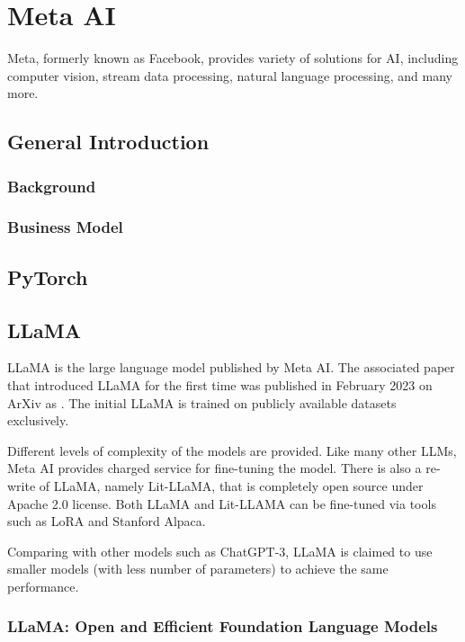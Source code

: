 \chapter{Meta AI} \label{ch:metaai}

Meta, formerly known as Facebook, provides variety of solutions for AI, including computer vision, stream data processing, natural language processing, and many more.

\section{General Introduction}

\subsection{Background}

\subsection{Business Model}

\section{PyTorch}

\section{LLaMA}

LLaMA is the large language model published by Meta AI. The associated paper that introduced LLaMA for the first time was published in February 2023 on ArXiv as \cite{touvron2023llama}. The initial LLaMA is trained on publicly available
datasets exclusively. 

Different levels of complexity of the models are provided. Like many other LLMs, Meta AI provides charged service for fine-tuning the model. There is also a re-write of LLaMA, namely Lit-LLaMA, that is completely open source under Apache 2.0 license. Both LLaMA and Lit-LLAMA can be fine-tuned via tools such as LoRA and Stanford Alpaca.

Comparing with other models such as ChatGPT-3, LLaMA is claimed to use smaller models (with less number of parameters) to achieve the same performance.

\subsection{LLaMA: Open and Efficient Foundation Language Models}

